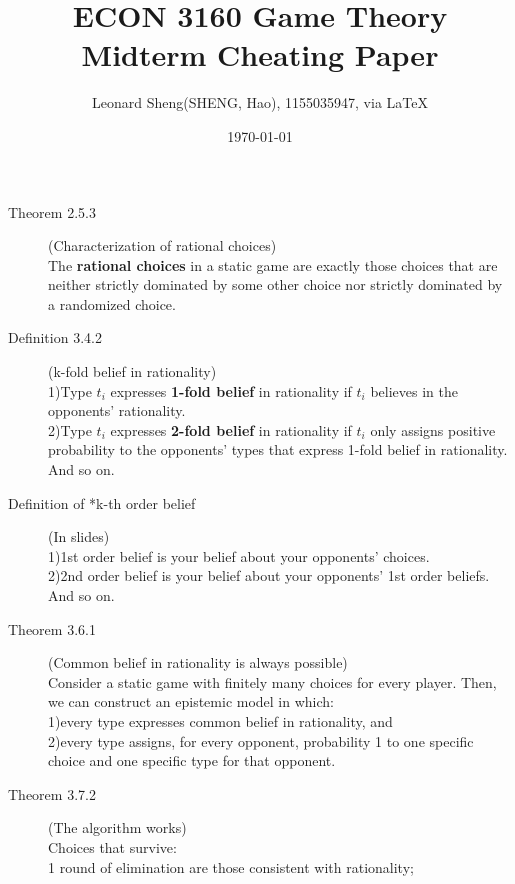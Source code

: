 \documentclass{article}
\begin{document}
\title{ECON 3160 Game Theory \\Midterm Cheating Paper}
\author{{\normalsize Leonard Sheng(SHENG, Hao), 1155035947, via \LaTeX}}
\date{\today}

\maketitle

\def \Pr{{\rm Pr}}

\baselineskip 0.6cm
\begin{description}
  \item[Theorem 2.5.3](Characterization of rational choices)\\
  The {\bf rational choices} in a static game are exactly those choices that are neither strictly dominated by some other choice nor strictly dominated by a randomized choice.
  \item[Definition 3.4.2] (k-fold belief in rationality)\\
  1)Type $t_i$ expresses {\bf 1-fold belief} in rationality if $t_i$ believes in the opponents' rationality.\\
  2)Type $t_i$ expresses {\bf 2-fold belief} in rationality if $t_i$ only assigns positive probability to the opponents' types that express 1-fold belief in rationality.\\
  And so on.
  \item[Definition of *k-th order belief](In slides)\\
  1)1st order belief is your belief about your opponents' choices.\\
  2)2nd order belief is your belief about your opponents' 1st order beliefs.\\
  And so on.
  \item[Theorem 3.6.1] (Common belief in rationality is always possible)\\
  Consider a static game with finitely many choices for every player. Then, we can construct an epistemic model in which:\\
  1)every type expresses common belief in rationality, and\\
  2)every type assigns, for every opponent, probability 1 to one specific choice and one specific type for that opponent.
  \item[Theorem 3.7.2] (The algorithm works)\\
  Choices that survive: \\
  1 round of elimination are those consistent with rationality;\\

\end{description}
\end{document}
